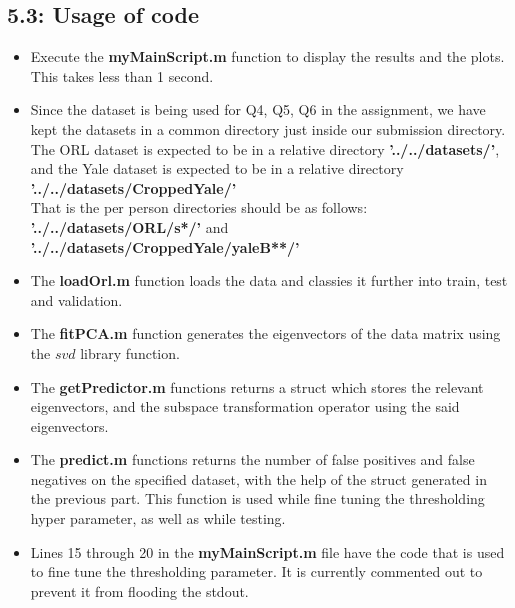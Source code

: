 \documentclass[12pt, a4paper]{article}
\begin{document}
\subsection*{5.3: Usage of code}
\begin{itemize}
\item Execute the \textbf{myMainScript.m} function to display the results and the plots. This takes less than 1 second.

\item Since the dataset is being used for Q4, Q5, Q6 in the assignment, we have kept the datasets in a common directory just inside our submission directory. The ORL dataset is expected to be in a relative directory \textbf{'../../datasets/'}, and the Yale dataset is expected to be in a relative directory \textbf{'../../datasets/CroppedYale/'} \\ 
That is the per person directories should be as follows: \\\textbf{'../../datasets/ORL/s*/'} and \\\textbf{'../../datasets/CroppedYale/yaleB**/'}

\item The \textbf{loadOrl.m} function loads the data and classies it further into train, test and validation.

\item The \textbf{fitPCA.m} function generates the eigenvectors of the data matrix using the $svd$ library function.

\item The \textbf{getPredictor.m} functions returns a struct which stores the relevant eigenvectors, and the subspace transformation operator using the said eigenvectors.

\item The \textbf{predict.m} functions returns the number of false positives and false negatives on the specified dataset, with the help of the struct generated in the previous part. This function is used while fine tuning the thresholding hyper parameter, as well as while testing.

\item Lines 15 through 20 in the \textbf{myMainScript.m} file have the code that is used to fine tune the thresholding parameter. It is currently commented out to prevent it from flooding the stdout.

\end{itemize}
\end{document}
